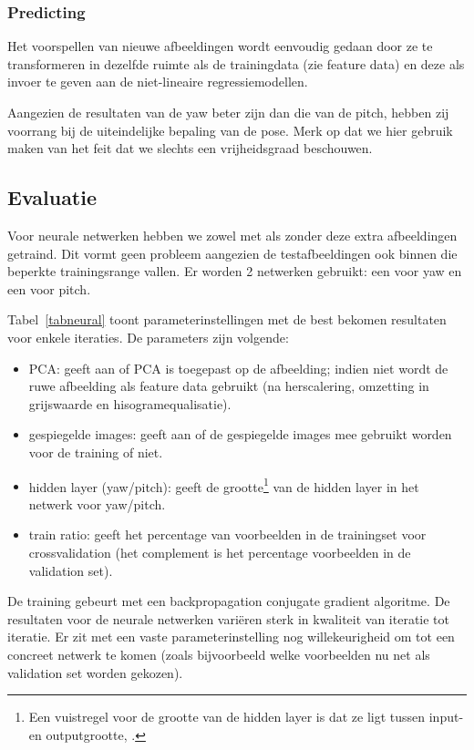 \documentclass[a4paper,dutch,11pt,]{scrartcl}
\begin{document}

\subsubsection{Predicting}
Het voorspellen van nieuwe afbeeldingen wordt eenvoudig gedaan door ze te transformeren in dezelfde ruimte als de trainingdata (zie feature data) en deze als invoer te geven aan de niet-lineaire regressiemodellen. 

Aangezien de resultaten van de yaw beter zijn dan die van de pitch,  hebben zij voorrang bij de uiteindelijke bepaling van de pose. Merk op dat we hier gebruik maken van het feit dat we slechts een vrijheidsgraad beschouwen.

\subsection{Evaluatie}
Voor neurale netwerken hebben we zowel met als zonder deze extra afbeeldingen getraind. Dit vormt geen probleem aangezien de testafbeeldingen ook binnen die beperkte trainingsrange vallen. Er worden 2 netwerken gebruikt: een voor yaw en een voor pitch.

Tabel~\ref{tabneural} toont parameterinstellingen met de best bekomen resultaten voor enkele iteraties. De parameters zijn volgende:
\begin{itemize}
\item PCA: geeft aan of PCA is toegepast op de afbeelding; indien niet wordt de ruwe afbeelding als feature data gebruikt (na herscalering, omzetting in grijswaarde en hisogramequalisatie).
\item gespiegelde images: geeft aan of de gespiegelde images mee gebruikt worden voor de training of niet.
\item hidden layer (yaw/pitch): geeft de grootte\footnote{Een vuistregel voor de grootte van de hidden layer is dat ze ligt tussen input- en outputgrootte, \cite{hiddenlayer}.}  van de hidden layer in het netwerk voor yaw/pitch.
\item train ratio: geeft het percentage van voorbeelden in de trainingset voor crossvalidation (het complement is het percentage voorbeelden in de validation set).
\end{itemize}

De training gebeurt met een backpropagation conjugate gradient algoritme. De resultaten voor de neurale netwerken vari\"eren sterk in kwaliteit van iteratie tot iteratie. Er zit met een vaste parameterinstelling nog willekeurigheid om tot een concreet netwerk te komen (zoals bijvoorbeeld welke voorbeelden nu net als validation set worden gekozen). 
\end{document}
